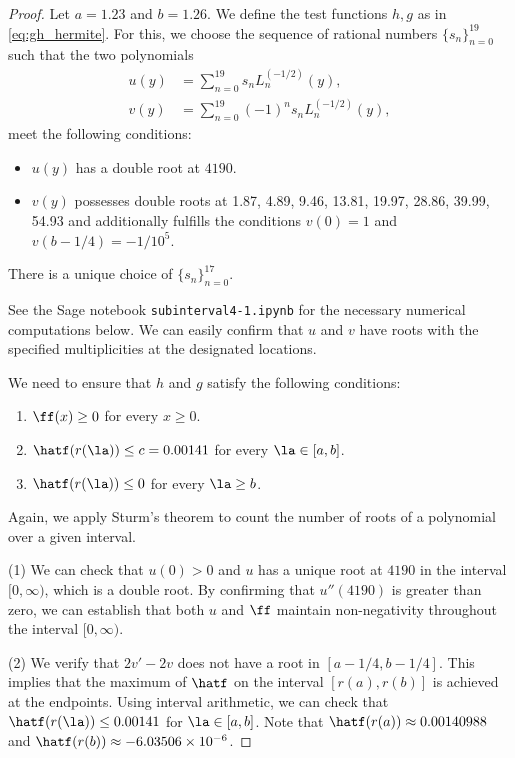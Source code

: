 \begin{proof}
Let $a = 1.23$ and $b = 1.26$.
We define the test functions $h,g$ as in \eqref{eq:gh_hermite}.
For this, we choose the sequence of rational numbers \(\{s_n\}_{n=0}^{19}\) such that the two polynomials
\begin{align*}
u(y) &= \sum_{n=0}^{19} s_n L_n^{(-1/2)}(y),\\
v(y) &= \sum_{n=0}^{19} (-1)^n s_n L_n^{(-1/2)}(y),
\end{align*}
meet the following conditions:

\begin{itemize}
    \item \(u(y)\) has a double root at \(4190\).
    \item \(v(y)\) possesses double roots at 1.87, 4.89, 9.46, 13.81, 19.97, 28.86, 39.99, 54.93 and additionally fulfills the conditions \(v(0)=1\) and \(v(b-1/4) = -1/10^5\).
\end{itemize}
There is a unique choice of \(\{s_n\}_{n=0}^{17}\).

See the Sage notebook \texttt{subinterval4-1.ipynb} for the necessary numerical computations below.
We can easily confirm that $u$ and $v$ have roots with the specified multiplicities at the designated locations.

We need to ensure that $h$ and $g$ satisfy the following conditions:
\begin{enumerate}
    \item $\ff(x)\geq 0$ for every $x \geq 0$.
    \item $\hatf(r(\la))\leq c=0.00141$ for every $\la \in [a, b]$.
    \item $\hatf(r(\la))\leq 0$ for every $\la \geq b$.
\end{enumerate}
Again, we apply Sturm's theorem to count the number of roots of a polynomial over a given interval.

(1) 
We can check that $u(0)> 0$ and $u$ has a unique root at \(4190\) in the interval $[0, \infty)$, which is a double root.
By confirming that $u''(4190)$ is greater than zero, we can establish that both $u$ and $\ff$ maintain non-negativity throughout the interval $[0,\infty)$.

(2)
We verify that \(2v'-2v\) does not have a root in \([a-1/4, b-1/4]\).
This implies that the maximum of $\hatf$ on the interval $[r(a),r(b)]$ is achieved at the endpoints. 
Using interval arithmetic, we can check that $\hatf(r(\la)) \leq  0.00141$ for $\la\in [a, b]$.
Note that 
$\hatf(r(a)) \approx 0.00140988$ and $\hatf(r(b)) \approx -6.03506\times 10^{-6}$.


\end{proof}
